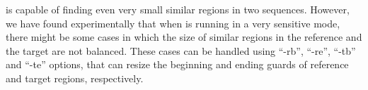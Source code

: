 \smashpp is capable of finding even very small similar regions in two sequences. However, we have found experimentally that when \smashpp is running in a very sensitive mode, there might be some cases in which the size of similar regions in the reference and the target are not balanced. These cases can be handled using ``-rb'', ``-re'', ``-tb'' and ``-te'' options, that can resize the beginning and ending guards of reference and target regions, respectively.
